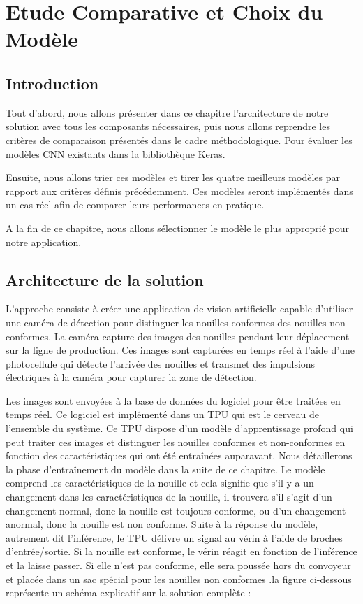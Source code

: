 \chapter{Etude Comparative et Choix du Modèle}
\section{Introduction}
Tout d'abord, nous allons présenter dans ce chapitre l'architecture de notre solution avec tous les composants nécessaires, puis nous allons reprendre les critères de comparaison présentés dans le cadre méthodologique. Pour évaluer les modèles CNN existants dans la bibliothèque Keras. 

Ensuite, nous allons trier ces modèles et tirer les quatre meilleurs modèles par rapport aux critères définis précédemment. Ces modèles seront implémentés dans un cas réel afin de comparer leurs performances en pratique.  

A la fin de ce chapitre, nous allons sélectionner le modèle le plus approprié pour notre application. 

\section{Architecture de la solution}
L'approche consiste à créer une application de vision artificielle capable d'utiliser une caméra de détection pour distinguer les nouilles conformes des nouilles non conformes. La caméra capture des images des nouilles pendant leur déplacement sur la ligne de production. Ces images sont capturées en temps réel à l'aide d'une photocellule qui détecte l'arrivée des nouilles et transmet des impulsions électriques à la caméra pour capturer la zone de détection. 

Les images sont envoyées à la base de données du logiciel pour être traitées en temps réel. Ce logiciel est implémenté dans un TPU qui est le cerveau de l'ensemble du système. Ce TPU dispose d'un modèle d'apprentissage profond qui peut traiter ces images et distinguer les nouilles conformes et non-conformes en fonction des caractéristiques qui ont été entraînées auparavant. Nous détaillerons la phase d'entraînement du modèle dans la suite de ce chapitre. Le modèle comprend les caractéristiques de la nouille et cela signifie que s'il y a un changement dans les caractéristiques de la nouille, il trouvera s'il s'agit d'un changement normal, donc la nouille est toujours conforme, ou d'un changement anormal, donc la nouille est non conforme. 
\newpage
Suite à la réponse du modèle, autrement dit l'inférence, le TPU délivre un signal au vérin à l'aide de broches d'entrée/sortie. Si la nouille est conforme, le vérin réagit en fonction de l'inférence et la laisse passer. Si elle n'est pas conforme, elle sera poussée hors du convoyeur et placée dans un sac spécial pour les nouilles non conformes .la figure ci-dessous représente un schéma explicatif sur la solution complète : 

